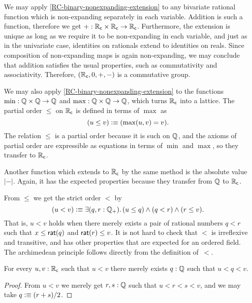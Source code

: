 We may apply \autoref{RC-binary-nonexpanding-extension} to any bivariate rational function
which is non-expanding separately in each variable. Addition is such a function, therefore
we get ${+} : \mathbb{R}_\mathsf{c} \times \mathbb{R}_\mathsf{c} \to \mathbb{R}_\mathsf{c}$. Furthermore, the extension is unique as long as we
require it to be non-expanding in each variable, and just as in the univariate case,
identities on rationals extend to identities on reals. Since composition of non-expanding
maps is again non-expanding, we may conclude that addition satisfies the usual properties,
such as commutativity and associativity. Therefore, $(\mathbb{R}_\mathsf{c}, 0, {+}, {-})$ is a commutative
group.

We may also apply \autoref{RC-binary-nonexpanding-extension} to the functions $\min : \mathbb{Q} \times
\mathbb{Q} \to \mathbb{Q}$ and $\max : \mathbb{Q} \times \mathbb{Q} \to \mathbb{Q}$, which turns $\mathbb{R}_\mathsf{c}$ into a lattice. The partial
order $\leq$ on $\mathbb{R}_\mathsf{c}$ is defined in terms of $\max$ as
%
\begin{equation*}
  (u \leq v) \vcentcolon\equiv (\max(u, v) = v).
\end{equation*}
%
The relation $\leq$ is a partial order because it is such on $\mathbb{Q}$, and the axioms of
partial order are expressible as equations in terms of $\min$ and $\max$, so they transfer
to $\mathbb{R}_\mathsf{c}$.

Another function which extends to $\mathbb{R}_\mathsf{c}$ by the same method is the absolute value $|{-}|$.
Again, it has the expected properties because they transfer from $\mathbb{Q}$ to $\mathbb{R}_\mathsf{c}$.

From $\leq$ we get the strict order $<$ by
%
\begin{equation*}
  (u < v) \defeq \exis{q, r : \Qp} (u \leq q) \land (q < r) \land (r \leq v).
\end{equation*}
%
That is, $u < v$ holds when there merely exists a pair of rational numbers $q < r$ such that $x \leq
\mathsf{rat}(q)$ and $\mathsf{rat}(r) \leq v$. It is not hard to check that $<$ is irreflexive and
transitive, and has other properties that are expected for an ordered field.
The archimedean principle follows directly from the definition of~$<$.

\begin{thm} \label{RC-archimedean}
  For every $u, v : \mathbb{R}_\mathsf{c}$ such that $u < v$ there merely exists $q : \mathbb{Q}$ such that $u < q < v$.
\end{thm}

\begin{proof}
  From $u < v$ we merely get $r, s : \mathbb{Q}$ such that $u < r < s < v$, and we may take $q
  \vcentcolon\equiv (r + s) / 2$.
\end{proof}

